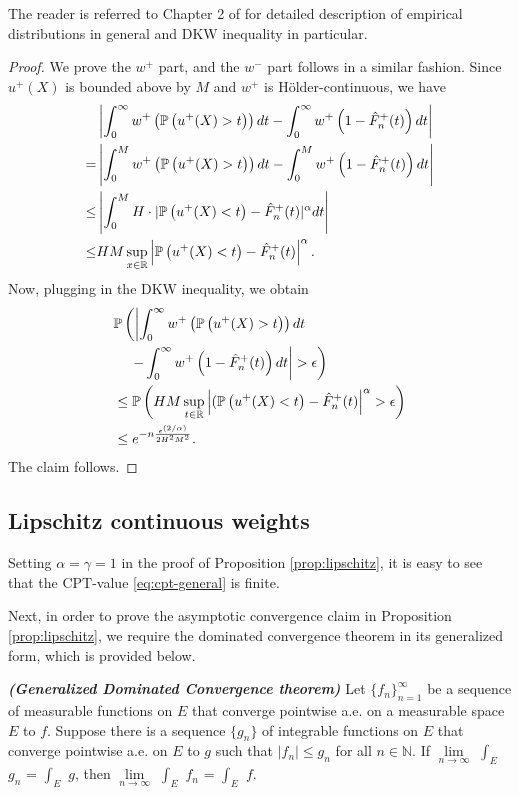 The reader is referred to Chapter 2 of \cite{wasserman2006} for detailed description of empirical distributions in general and DKW inequality in particular.

\begin{proof}
We prove the $w^+$ part, and the $w^-$ part follows in a similar fashion.
Since $u^+(X)$ is bounded above by $M$ and $w^+$ is H\"{o}lder-continuous, we have
\begin{align*}
&\left|\int_0^{\infty} w^+\left(\mathbb{P}\left( u^+(X)>t \right)\right) dt- \int_0^{\infty} w^+\left(1- {\hat F^+_n}(t)\right) dt\right| \\ = &
    \left|\int_0^M w^+\left(\mathbb{P}\left( u^+(X)>t \right)\right) dt- \int_0^M w^+\left(1- {\hat F^+_n}(t)\right) dt\right| \\
\leq& \left|\int_0^M H\cdot |\mathbb{P}\left( u^+(X)<t \right)-{\hat F^+_n}(t)|^\alpha dt\right|\\ \leq& HM\sup_{x\in
\mathbb{R}}\left|\mathbb{P}\left( u^+(X)<t \right)-{\hat F^+_n}(t)\right|^\alpha.
\end{align*}
Now, plugging in the DKW inequality, we obtain
\begin{align}
&\mathbb{P}\left(\left|\intinfinity w^+\left(\Prob{u^+(X)>t}\right) dt \right.\right.\nonumber\\
&\quad\left.\left.- \intinfinity w^+\left(1- {\hat F^+_n}(t)\right) dt\right|>\epsilon\right)
\nonumber\\
& \leq \Prob{HM\sup_{t\in \mathbb{R}} \left|(\Prob{u^+(X)<t}-{\hat F^+_n}(t)\right|^\alpha>\epsilon}\nonumber\\
&
\leq  e^{-n \frac{\epsilon ^{(2/\alpha)}} {2 H^2 M^2}}.\label{eq:dkw3}
\end{align}
The claim follows.
\end{proof}

\subsection{Lipschitz continuous weights}
\label{sec:lipschitz-proofs}
 Setting $\alpha=\gamma=1$ in the proof of Proposition \ref{prop:lipschitz}, it is easy to see that the CPT-value \eqref{eq:cpt-general} is finite. 

Next, in order to prove the asymptotic convergence claim in Proposition \ref{prop:lipschitz}, we require the dominated convergence theorem in its generalized form, which is provided below.
\begin{theorem}{\textbf{\textit{(Generalized Dominated Convergence theorem)}}}
Let $\{f_n\}_{n=1}^\infty$ be a sequence of measurable functions on $E$ that converge pointwise a.e. on a measurable space $E$ to $f$.  Suppose there is a sequence $\{g_n\}$ of integrable functions on $E$ that converge pointwise a.e. on $E$ to $g$ such that $|f_n| \leq g_n$ for all $n \in \mathbb{N}$.  
If $\lim\limits_{n \rightarrow \infty}$ $\int_E$ $g_n$ = $\int_E$ $g$, then $\lim\limits_{n \rightarrow \infty}$ $\int_E$ $f_n$ = $\int_E$ $f$.
\end{theorem}


